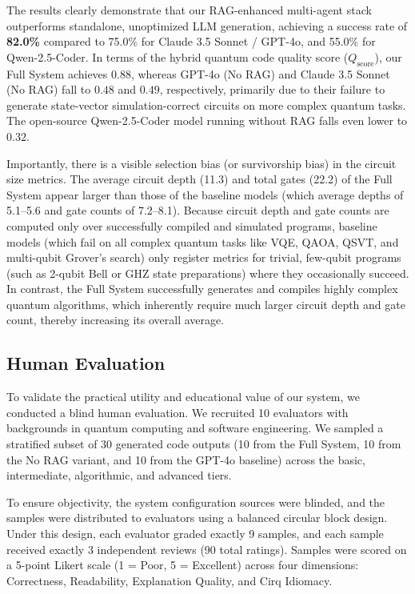\documentclass[runningheads]{llncs}
\begin{document}
\noindent
The results clearly demonstrate that our RAG-enhanced multi-agent stack outperforms standalone, unoptimized LLM generation, achieving a success rate of \textbf{82.0\%} compared to 75.0\% for Claude 3.5 Sonnet / GPT-4o, and 55.0\% for Qwen-2.5-Coder. In terms of the hybrid quantum code quality score ($Q_{\text{score}}$), our Full System achieves $0.88$, whereas GPT-4o (No RAG) and Claude 3.5 Sonnet (No RAG) fall to $0.48$ and $0.49$, respectively, primarily due to their failure to generate state-vector simulation-correct circuits on more complex quantum tasks. The open-source Qwen-2.5-Coder model running without RAG falls even lower to $0.32$.

Importantly, there is a visible selection bias (or survivorship bias) in the circuit size metrics. The average circuit depth (11.3) and total gates (22.2) of the Full System appear larger than those of the baseline models (which average depths of 5.1--5.6 and gate counts of 7.2--8.1). Because circuit depth and gate counts are computed only over successfully compiled and simulated programs, baseline models (which fail on all complex quantum tasks like VQE, QAOA, QSVT, and multi-qubit Grover's search) only register metrics for trivial, few-qubit programs (such as 2-qubit Bell or GHZ state preparations) where they occasionally succeed. In contrast, the Full System successfully generates and compiles highly complex quantum algorithms, which inherently require much larger circuit depth and gate count, thereby increasing its overall average.

\subsection{Human Evaluation}
To validate the practical utility and educational value of our system, we conducted a blind human evaluation. We recruited 10 evaluators with backgrounds in quantum computing and software engineering. We sampled a stratified subset of 30 generated code outputs (10 from the Full System, 10 from the No RAG variant, and 10 from the GPT-4o baseline) across the basic, intermediate, algorithmic, and advanced tiers. 

To ensure objectivity, the system configuration sources were blinded, and the samples were distributed to evaluators using a balanced circular block design. Under this design, each evaluator graded exactly 9 samples, and each sample received exactly 3 independent reviews (90 total ratings). Samples were scored on a 5-point Likert scale (1 = Poor, 5 = Excellent) across four dimensions: Correctness, Readability, Explanation Quality, and Cirq Idiomacy.
\end{document}
